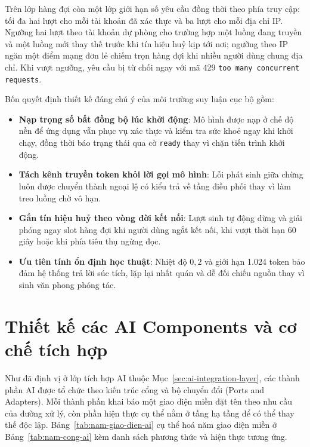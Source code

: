 Trên lớp hàng đợi còn một lớp giới hạn số yêu cầu đồng thời theo phía truy cập: tối đa hai lượt cho mỗi tài khoản đã xác thực và ba lượt cho mỗi địa chỉ IP. Ngưỡng hai lượt theo tài khoản dự phòng cho trường hợp một luồng đang truyền và một luồng mới thay thế trước khi tín hiệu huỷ kịp tới nơi; ngưỡng theo IP ngăn một điểm mạng đơn lẻ chiếm trọn hàng đợi khi nhiều người dùng chung địa chỉ. Khi vượt ngưỡng, yêu cầu bị từ chối ngay với mã 429 \texttt{too many concurrent requests}.

Bốn quyết định thiết kế đáng chú ý của môi trường suy luận cục bộ gồm:
\begin{itemize}
    \item[--] \textbf{Nạp trọng số bất đồng bộ lúc khởi động}: Mô hình được nạp ở chế độ nền để ứng dụng vẫn phục vụ xác thực và kiểm tra sức khoẻ ngay khi khởi chạy, đồng thời báo trạng thái qua cờ \texttt{ready} thay vì chặn tiến trình khởi động.
    \item[--] \textbf{Tách kênh truyền token khỏi lời gọi mô hình}: Lỗi phát sinh giữa chừng luôn được chuyển thành ngoại lệ có kiểu trả về tầng điều phối thay vì làm treo luồng chờ vô hạn.
    \item[--] \textbf{Gắn tín hiệu huỷ theo vòng đời kết nối}: Lượt sinh tự động dừng và giải phóng ngay slot hàng đợi khi người dùng ngắt kết nối, khi vượt thời hạn 60 giây hoặc khi phía tiêu thụ ngừng đọc.
    \item[--] \textbf{Ưu tiên tính ổn định học thuật}: Nhiệt độ $0{,}2$ và giới hạn 1.024 token bảo đảm hệ thống trả lời súc tích, lặp lại nhất quán và dễ đối chiếu nguồn thay vì sinh văn phong phóng tác.
\end{itemize}

\section{Thiết kế các AI Components và cơ chế tích hợp}
\label{sec:ai-components}

Như đã định vị ở lớp tích hợp AI thuộc Mục~\ref{sec:ai-integration-layer}, các thành phần AI được tổ chức theo kiến trúc cổng và bộ chuyển đổi (Ports and Adapters). Mỗi thành phần khai báo một giao diện miền đặt tên theo nhu cầu của đường xử lý, còn phần hiện thực cụ thể nằm ở tầng hạ tầng để có thể thay thế độc lập. Bảng~\ref{tab:nam-giao-dien-ai} cụ thể hoá năm giao diện miền ở Bảng~\ref{tab:nam-cong-ai} kèm danh sách phương thức và hiện thực tương ứng.

